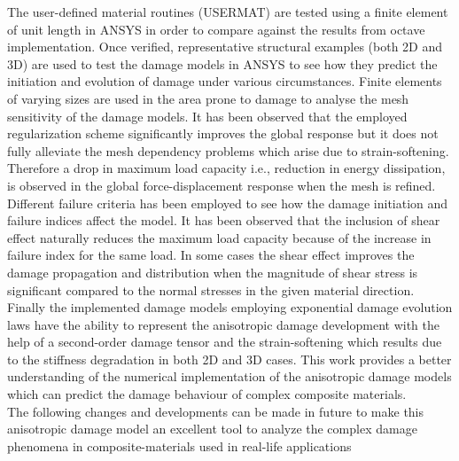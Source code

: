 \documentclass[12pt,a4paper,twoside,openright]{report}
\begin{document}
\indent\indent\indent The user-defined material routines (USERMAT) are tested using a finite element of unit length in ANSYS in order to compare against the results from octave implementation. Once verified, representative structural examples (both 2D and 3D) are used to test the damage models in ANSYS to see how they predict the initiation and evolution of damage under various circumstances. Finite elements of varying sizes are used in the area prone to damage to analyse the mesh sensitivity of the damage models. It has been observed that the employed regularization scheme  significantly improves the global response but it does not fully alleviate the mesh dependency problems which arise due to strain-softening. Therefore a drop in maximum load capacity i.e., reduction in energy dissipation, is observed in the global force-displacement response when the mesh is refined. Different failure criteria has been employed to see how the damage initiation and failure indices affect the model. It has been observed that the inclusion of shear effect naturally reduces the maximum load capacity because of the increase in failure index for the same load. In some cases the shear effect improves the damage propagation and distribution when the magnitude of shear stress is significant compared to the normal stresses in the given material direction. Finally the implemented damage models employing exponential damage evolution laws have the ability to represent the anisotropic damage development with the help of a second-order damage tensor and the strain-softening which results due to the stiffness degradation in both 2D and 3D cases. This work provides a better understanding of the numerical implementation of the anisotropic damage models which can predict the damage behaviour of complex composite materials.\\

The following changes and developments can be made in future to make this anisotropic damage model an excellent tool to analyze the complex damage phenomena in composite-materials used in real-life applications
\end{document}
